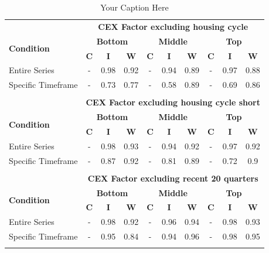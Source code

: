 \begin{table}[h!]
\begin{tabular}{l c c c c c c c c c}
&\multicolumn{9}{c}{\textbf{CEX Factor excluding housing cycle}} \vspace{2mm}\\
\multirow{2}{*}{\textbf{Condition}} & \multicolumn{3}{c}{\textbf{Bottom}} & \multicolumn{3}{c}{\textbf{Middle}} & \multicolumn{3}{c}{\textbf{Top}} \\
& \textbf{C}& \textbf{I}& \textbf{W}& \textbf{C}& \textbf{I}& \textbf{W}& \textbf{C}& \textbf{I}& \textbf{W} \\
Entire Series & - & 0.98 & 0.92 & - & 0.94 & 0.89 & - & 0.97 & 0.88 \\
Specific Timeframe & - & 0.73 & 0.77 & - & 0.58 & 0.89 & - & 0.69 & 0.86 \\
\vspace{2mm}\\
&\multicolumn{9}{c}{\textbf{CEX Factor excluding housing cycle short}} \vspace{2mm}\\
\multirow{2}{*}{\textbf{Condition}} & \multicolumn{3}{c}{\textbf{Bottom}} & \multicolumn{3}{c}{\textbf{Middle}} & \multicolumn{3}{c}{\textbf{Top}} \\
& \textbf{C}& \textbf{I}& \textbf{W}& \textbf{C}& \textbf{I}& \textbf{W}& \textbf{C}& \textbf{I}& \textbf{W} \\
Entire Series & - & 0.98 & 0.93 & - & 0.94 & 0.92 & - & 0.97 & 0.92 \\
Specific Timeframe & - & 0.87 & 0.92 & - & 0.81 & 0.89 & - & 0.72 & 0.9 \\
\vspace{2mm}\\
&\multicolumn{9}{c}{\textbf{CEX Factor excluding recent 20 quarters}} \vspace{2mm}\\
\multirow{2}{*}{\textbf{Condition}} & \multicolumn{3}{c}{\textbf{Bottom}} & \multicolumn{3}{c}{\textbf{Middle}} & \multicolumn{3}{c}{\textbf{Top}} \\
& \textbf{C}& \textbf{I}& \textbf{W}& \textbf{C}& \textbf{I}& \textbf{W}& \textbf{C}& \textbf{I}& \textbf{W} \\
Entire Series & - & 0.98 & 0.92 & - & 0.96 & 0.94 & - & 0.98 & 0.93 \\
Specific Timeframe & - & 0.95 & 0.84 & - & 0.94 & 0.96 & - & 0.98 & 0.95 \\
\vspace{2mm}\\
\bottomrule\bottomrule
\end{tabular}
\caption{Your Caption Here}
\label{tab:your_label}
\end{table}
